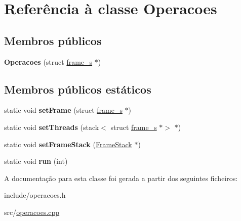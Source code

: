 \hypertarget{classOperacoes}{}\section{Referência à classe Operacoes}
\label{classOperacoes}
\subsection*{Membros públicos}
\begin{DoxyCompactItemize}
\item 
\mbox{\label{classOperacoes_a2122b7e6890e56a386118b62b32a7523}} 
{\bfseries Operacoes} (struct \hyperlink{structframe__s}{frame\+\_\+s} $\ast$)
\end{DoxyCompactItemize}
\subsection*{Membros públicos estáticos}
\begin{DoxyCompactItemize}
\item 
\mbox{\label{classOperacoes_a787f291554d319e73daa2e91d77823bd}} 
static void {\bfseries set\+Frame} (struct \hyperlink{structframe__s}{frame\+\_\+s} $\ast$)
\item 
\mbox{\label{classOperacoes_ac50ddb76ffb9bcd17ac19e449ac52e39}} 
static void {\bfseries set\+Threads} (stack$<$ struct \hyperlink{structframe__s}{frame\+\_\+s} $\ast$$>$ $\ast$)
\item 
\mbox{\label{classOperacoes_a458ce9c1aec4fd809eecee9b005fcbf5}} 
static void {\bfseries set\+Frame\+Stack} (\hyperlink{classFrameStack}{Frame\+Stack} $\ast$)
\item 
\mbox{\label{classOperacoes_ac25eec2246429c071161b918ec447b18}} 
static void {\bfseries run} (int)
\end{DoxyCompactItemize}


A documentação para esta classe foi gerada a partir dos seguintes ficheiros\+:\begin{DoxyCompactItemize}
\item 
include/operacoes.\+h\item 
src/\hyperlink{operacoes_8cpp}{operacoes.\+cpp}\end{DoxyCompactItemize}
